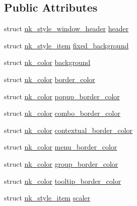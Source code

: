 \subsection*{Public Attributes}
\begin{DoxyCompactItemize}
\item 
struct \mbox{\hyperlink{structnk__style__window__header}{nk\+\_\+style\+\_\+window\+\_\+header}} \mbox{\hyperlink{structnk__style__window_ab7b7c6889cc1f8dd34e55b556835ccec}{header}}
\item 
struct \mbox{\hyperlink{structnk__style__item}{nk\+\_\+style\+\_\+item}} \mbox{\hyperlink{structnk__style__window_a02b8b0446c123c39ac66bada5c85028d}{fixed\+\_\+background}}
\item 
struct \mbox{\hyperlink{structnk__color}{nk\+\_\+color}} \mbox{\hyperlink{structnk__style__window_a0e55fd791308fc8d44db3a28736597fb}{background}}
\item 
struct \mbox{\hyperlink{structnk__color}{nk\+\_\+color}} \mbox{\hyperlink{structnk__style__window_a588fddddfff17e20424605dd0752c5e0}{border\+\_\+color}}
\item 
struct \mbox{\hyperlink{structnk__color}{nk\+\_\+color}} \mbox{\hyperlink{structnk__style__window_a183e2d22fce0f95b1d4dca1a5df1fe95}{popup\+\_\+border\+\_\+color}}
\item 
struct \mbox{\hyperlink{structnk__color}{nk\+\_\+color}} \mbox{\hyperlink{structnk__style__window_a4d713f3f55ceac37afd0325affec96c0}{combo\+\_\+border\+\_\+color}}
\item 
struct \mbox{\hyperlink{structnk__color}{nk\+\_\+color}} \mbox{\hyperlink{structnk__style__window_ab476750247048a6857f70c19e3f1f8db}{contextual\+\_\+border\+\_\+color}}
\item 
struct \mbox{\hyperlink{structnk__color}{nk\+\_\+color}} \mbox{\hyperlink{structnk__style__window_af0042cffbc72da702432ee1f3917d73c}{menu\+\_\+border\+\_\+color}}
\item 
struct \mbox{\hyperlink{structnk__color}{nk\+\_\+color}} \mbox{\hyperlink{structnk__style__window_a3f27932c225305d78887c18aeb788c37}{group\+\_\+border\+\_\+color}}
\item 
struct \mbox{\hyperlink{structnk__color}{nk\+\_\+color}} \mbox{\hyperlink{structnk__style__window_acfc60df8137d2d6dfa344a39a0fc50e7}{tooltip\+\_\+border\+\_\+color}}
\item 
struct \mbox{\hyperlink{structnk__style__item}{nk\+\_\+style\+\_\+item}} \mbox{\hyperlink{structnk__style__window_a0b0b85091e31b0d2444e9cf761e9d878}{scaler}}
\item 

\end{DoxyCompactItemize}
